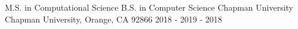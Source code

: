 

\begin{cventries}

\cventry
    {M.S. in Computational Science \linebreak B.S. in Computer Science} %
    {Chapman University} %
    {Chapman University, Orange, CA 92866} %
    {2018 - 2019  - 2018} %
    {
    }
\vspace{-0.7cm}
\end{cventries}